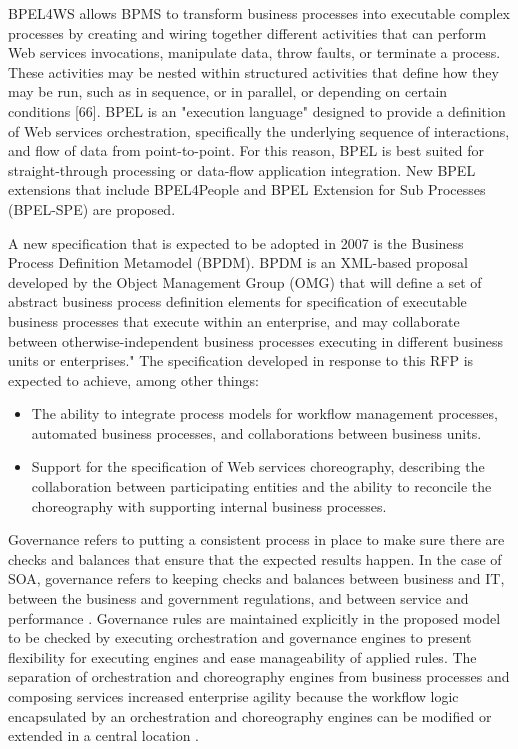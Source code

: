 \documentclass[12pt,a4paper,final,twoside,onecolumn,titlepage]{book}
\begin{document}
\gls{BPEL4WS} allows \gls{BPMS} to transform business processes into executable complex processes by creating and wiring together different activities that can perform Web services invocations, manipulate data, throw faults, or terminate a process. These activities may be nested within structured activities that define how they may be run, such as in sequence, or in parallel, or depending on certain conditions [66]. \gls{BPEL} is an "execution language" designed to provide a definition of Web services orchestration, specifically the underlying sequence of interactions, and flow of data from point-to-point. For this reason, \gls{BPEL} is best suited for straight-through processing or data-flow application integration. New \gls{BPEL} extensions that include BPEL4People and \gls{BPEL} Extension for Sub Processes (BPEL-SPE) are proposed.

A new specification that is expected to be adopted in 2007 is the Business Process Definition Metamodel (BPDM). BPDM is an \gls{XML}-based proposal developed by the Object Management Group (OMG) that will define a set of abstract business process definition elements for specification of executable business processes that execute within an enterprise, and may collaborate between otherwise-independent business processes executing in different business units or enterprises." The specification developed in response to this RFP is expected to achieve, among other things:
\begin{itemize}
\item The ability to integrate process models for workflow management processes, automated business processes, and collaborations between business units.
\item Support for the specification of Web services choreography, describing the collaboration between participating entities and the ability to reconcile the choreography with supporting internal business processes.
\end{itemize}
Governance refers to putting a consistent process in place to make sure there are checks and balances that ensure that the expected results happen. In the case of \gls{SOA}, governance refers to keeping checks and balances between business and IT, between the business and government regulations, and between service and performance \cite{M38}. Governance rules are maintained explicitly in the proposed model to be checked by executing orchestration and governance engines to present flexibility for executing engines and ease manageability of applied rules. The separation of orchestration and choreography engines from business processes and composing services increased enterprise agility because the workflow logic encapsulated by an orchestration and choreography engines can be modified or extended in a central location \cite{BS58}.
\end{document}
